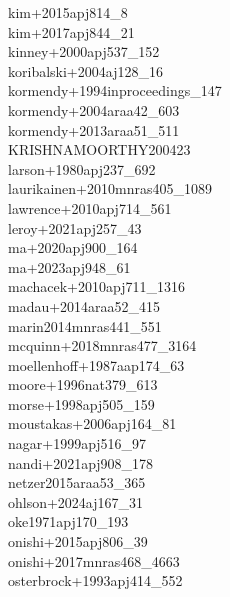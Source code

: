 \documentclass{article}
\begin{document}
\noindent kim+2015apj814_8 \color{black} \\
\noindent kim+2017apj844_21 \color{black} \\
\noindent kinney+2000apj537_152 \color{black} \\
\noindent koribalski+2004aj128_16 \color{black} \\
\noindent kormendy+1994inproceedings_147 \color{black} \\
\noindent kormendy+2004araa42_603 \color{black} \\
\noindent kormendy+2013araa51_511 \color{black} \\
\noindent KRISHNAMOORTHY200423 \color{black} \\
\noindent larson+1980apj237_692 \color{black} \\
\noindent laurikainen+2010mnras405_1089 \color{black} \\
\noindent lawrence+2010apj714_561 \color{black} \\
\noindent leroy+2021apj257_43 \color{black} \\
\noindent ma+2020apj900_164 \color{black} \\
\noindent ma+2023apj948_61 \color{black} \\
\noindent machacek+2010apj711_1316 \color{black} \\
\noindent madau+2014araa52_415 \color{black} \\
\noindent marin2014mnras441_551 \color{black} \\
\noindent mcquinn+2018mnras477_3164 \color{black} \\
\noindent moellenhoff+1987aap174_63 \color{black} \\
\noindent moore+1996nat379_613 \color{black} \\
\noindent morse+1998apj505_159 \color{black} \\
\noindent moustakas+2006apj164_81 \color{black} \\
\noindent nagar+1999apj516_97 \color{black} \\
\noindent nandi+2021apj908_178 \color{black} \\
\noindent netzer2015araa53_365 \color{black} \\
\noindent ohlson+2024aj167_31 \color{black} \\
\noindent oke1971apj170_193 \color{black} \\
\noindent onishi+2015apj806_39 \color{black} \\
\noindent onishi+2017mnras468_4663 \color{black} \\
\noindent osterbrock+1993apj414_552 \color{black} \\
\end{document}
